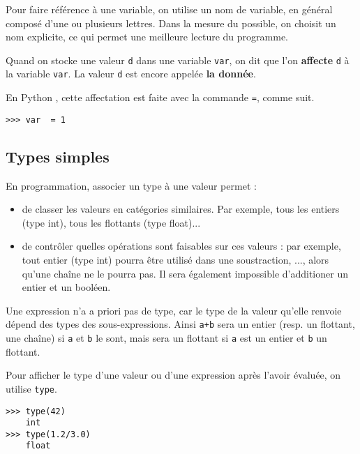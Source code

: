 Pour faire référence à une variable, on utilise un nom de variable, en général composé d'une ou 
plusieurs lettres. Dans la mesure du possible, on choisit un nom explicite, ce qui permet une 
meilleure lecture du programme.



\begin{defi}[Affectation]
Quand on stocke une valeur \lstinline{d} dans une variable \lstinline{var}, on dit que l'on 
\textbf{affecte} \lstinline{d} à la variable \lstinline{var}. La valeur
\lstinline{d} est encore appelée \textbf{la donnée}.
\end{defi}

En Python , cette affectation est faite avec la commande \lstinline{=}, comme suit.  

\begin{lstlisting}
>>> var  = 1
\end{lstlisting}





\subsection{Types simples}

En programmation, associer un type à une valeur permet :
\begin{itemize}
\item de classer les valeurs en catégories similaires. Par exemple, tous les
entiers (type int), tous les flottants (type float)...
\item de contrôler quelles opérations sont faisables sur ces valeurs : par
exemple, tout entier (type int) pourra être utilisé dans une soustraction, ..., alors 
qu'une chaîne ne le pourra pas. Il sera également impossible d'additioner un entier et un booléen. 
                                     
\end{itemize}

Une expression n'a a priori pas de type, car le type de la valeur qu'elle renvoie dépend des types 
des sous-expressions. Ainsi \lstinline{a+b} sera un entier (resp. un flottant, une chaîne) si 
\lstinline{a} et \lstinline{b} le sont, mais sera un flottant si \lstinline{a} est un entier et \lstinline{b} 
un flottant.


Pour afficher le type d'une valeur ou d'une expression après l'avoir évaluée, on utilise 
\lstinline{type}. 
\begin{lstlisting}
>>> type(42)
	int
>>> type(1.2/3.0)
	float
\end{lstlisting}





